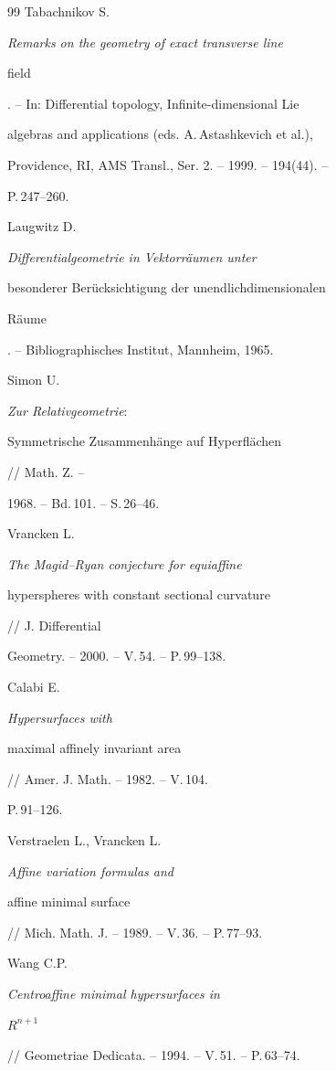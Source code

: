 \begin{thebibliography}{99}
Tabachnikov S. {\it Remarks on the geometry of exact transverse line

field}. -- In: Differential topology, Infinite-dimensional Lie

algebras and applications (eds. A.\,Astashkevich et al.),

Providence, RI, AMS Transl., Ser. 2. -- 1999. -- 194(44). --

P.\,247--260.




Laugwitz D. {\it Differentialgeometrie in Vektorr{\"a}umen unter

besonderer Ber{\"u}cksichtigung der unendlichdimensionalen

R{\"a}ume}. -- Bibliographisches Institut, Mannheim, 1965.




Simon U. {\it Zur Relativgeometrie$:$

Symmetrische Zusammenh{\"a}nge auf Hyperfl{\"a}chen} // Math. Z. --

1968. -- Bd.\,101. -- S.\,26--46.




Vrancken L. {\it The Magid--Ryan conjecture for equiaffine

hyperspheres with constant sectional curvature} // J. Differential

Geometry. -- 2000. -- V.\,54. -- P.\,99--138.




Calabi E. {\it Hypersurfaces with

maximal affinely invariant area} // Amer. J. Math. -- 1982. -- V.\,104.

P.\,91--126.




Verstraelen L., Vrancken L. {\it Affine variation formulas and

affine minimal surface} // Mich. Math. J. -- 1989. -- V.\,36. -- P.\,77--93.




Wang C.P. {\it Centroaffine minimal hypersurfaces in

$R^{n+1}$} // Geometriae Dedicata. -- 1994. -- V.\,51. -- P.\,63--74.




\end{thebibliography}
